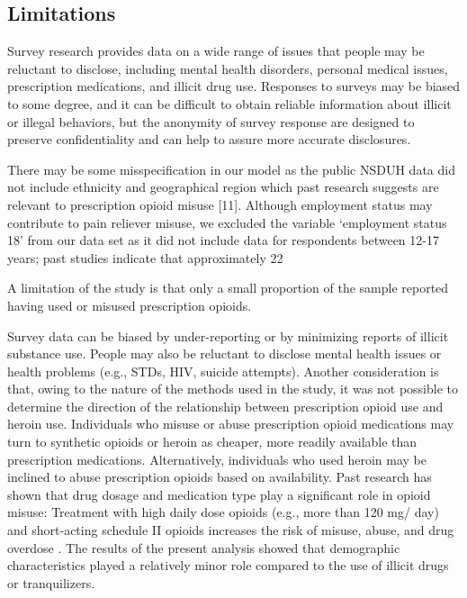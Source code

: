 \documentclass[sigconf]{acmart}
\begin{document}
\subsection{Limitations}
Survey research 
provides data on a wide range of issues that people may be reluctant to 
disclose, including mental health disorders, personal medical issues, 
prescription medications, and illicit drug use. Responses to surveys may be 
biased to some degree, and it can be difficult to obtain reliable information 
about illicit or illegal behaviors, but the anonymity of survey response are 
designed to preserve confidentiality and can help to assure more accurate 
disclosures. 


There may be some misspecification in our model as the public NSDUH data did not include ethnicity and geographical region which past research suggests are relevant to prescription opioid misuse [11]. Although employment status may contribute to pain reliever misuse, we excluded the variable ‘employment status 18’ from our data set as it did not include data for respondents between 12-17 years; past studies indicate that approximately 22%



A limitation of the study is that only a small proportion of the sample 
reported having used or misused prescription opioids.

Survey data can be biased by under-reporting or by 
minimizing reports of illicit substance use. People may also be reluctant to 
disclose mental health issues or health problems (e.g., STDs, HIV, suicide 
attempts). Another consideration is that, owing to the nature of the methods 
used in the study, it was not possible to determine the direction of the 
relationship between prescription opioid use and heroin use. Individuals who 
misuse or abuse prescription opioid medications may turn to synthetic opioids 
or heroin as cheaper, more readily available than prescription medications. 
Alternatively, individuals who used heroin may be inclined to abuse 
prescription opioids based on availability. Past research has shown that drug 
dosage and medication type play a significant role in opioid misuse: Treatment 
with high daily dose opioids (e.g., more than 120 mg/ day) and short-acting 
schedule II opioids increases the risk of misuse, abuse, and drug overdose 
\cite{sullivan10}. The results of the present analysis showed that demographic 
characteristics played a relatively minor role compared to the use of illicit 
drugs or tranquilizers. 
\end{document}
